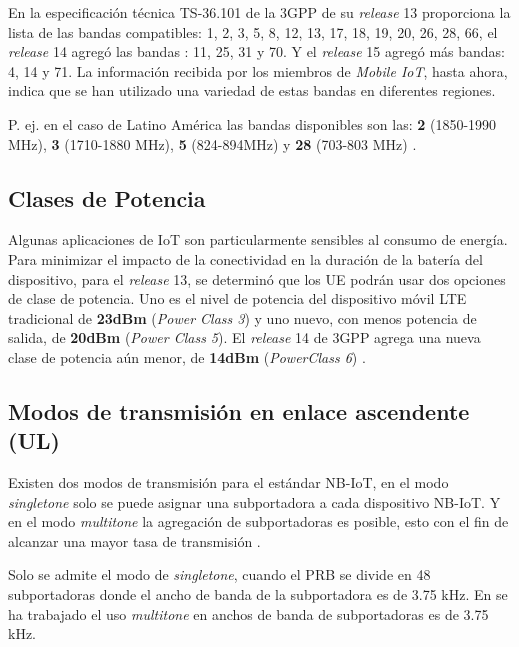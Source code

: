 En la especificación técnica TS-36.101 de la 3GPP de su \textit{release} 13 proporciona la lista de las bandas compatibles: 1, 2, 3, 5, 8, 12, 13, 17, 18, 19, 20, 26, 28, 66, el \textit{release} 14 agregó las bandas : 11, 25, 31 y 70. Y el \textit{release} 15 agregó más bandas: 4, 14 y 71. La información recibida por los miembros de \textit{Mobile IoT}, hasta ahora, indica que se han utilizado una variedad de estas bandas en diferentes regiones\parencite{NBIoTDeploymentGSMA}.\newline

P. ej. en el caso de Latino América las bandas disponibles son las: \textbf{2} (1850-1990 MHz), \textbf{3} (1710-1880 MHz), \textbf{5} (824-894MHz) y \textbf{28} (703-803 MHz) \parencite{NBIoTDeploymentGSMA}.

\subsection{Clases de Potencia}

Algunas aplicaciones de IoT son particularmente sensibles al consumo de energía. Para minimizar el impacto de la conectividad en la duración de la batería del dispositivo, para el \textit{release} 13, se determinó que los UE podrán usar dos opciones de clase de potencia. Uno es el nivel de potencia del dispositivo móvil LTE tradicional de \textbf{23dBm} (\textit{Power Class 3}) y uno nuevo, con menos potencia de salida, de \textbf{20dBm} (\textit{Power Class 5}). El \textit{release} 14 de 3GPP agrega una nueva clase de potencia aún menor, de \textbf{14dBm} (\textit{PowerClass 6}) \parencite{NBIoTDeploymentGSMA}.

\subsection{Modos de transmisión en enlace ascendente (UL) }
Existen dos modos de transmisión para el estándar NB-IoT, en el modo \textit{singletone} solo se puede asignar una subportadora a cada dispositivo NB-IoT. Y en el modo \textit{multitone} la agregación de subportadoras es posible, esto con el fin de alcanzar una mayor tasa de transmisión \parencite{RohdeNB}.\newline

Solo se admite el modo de \textit{singletone}, cuando el PRB se divide en 48 subportadoras donde el ancho de banda de la subportadora es de 3.75 kHz. En \parencite{Shahini2019} se ha trabajado el uso \textit{multitone} en anchos de banda de subportadoras es de 3.75 kHz.\newline

